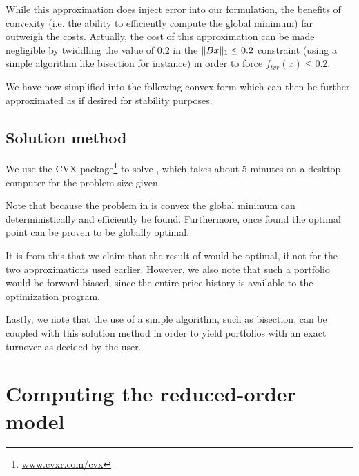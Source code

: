 \documentclass{article}
\begin{document}
    While this approximation does inject error into our formulation,
        the benefits of convexity (i.e. the ability to efficiently compute
        the global minimum) far outweigh the costs.
    Actually, the cost of this approximation can be made negligible by
        twiddling the value of $0.2$ 
        in the $\|Bx\|_1 \le 0.2$ constraint 
        (using a simple algorithm like bisection for instance)
        in order to force $f_{tvr}(x) \le 0.2$.
    
    We have now simplified  into the following convex form
        which can then be further approximated as 
        if desired for stability purposes.

\subsection{Solution method}
    We use the CVX package\footnote{\url{www.cvxr.com/cvx}} to solve 
        , which takes about 5 minutes on a desktop computer
        for the problem size given.

    Note that because the problem in  is convex
        the global minimum can deterministically and efficiently be found.
    Furthermore, once found the optimal point can be proven to be globally
        optimal.

    It is from this that we claim that the result of 
        would be optimal, if not for the two approximations used earlier.
    However, we also note that such a portfolio would be forward-biased,
        since the entire price history is available 
        to the optimization program.

    Lastly, we note that the use of a simple algorithm, such as bisection,
        can be coupled with this solution method
        in order to yield portfolios with an exact turnover 
        as decided by the user.

\section{Computing the reduced-order model}   
\end{document}
